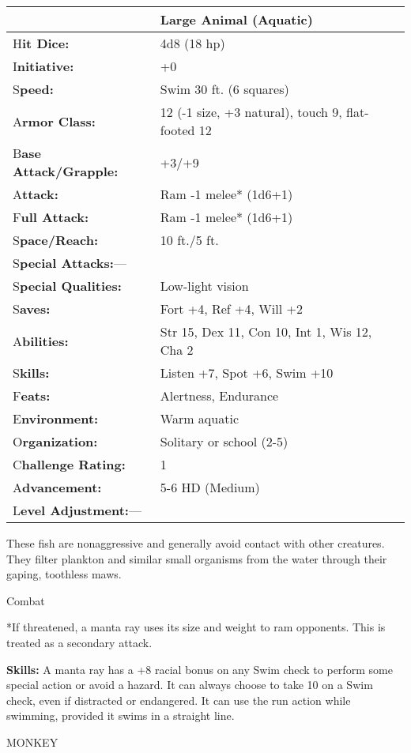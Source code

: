 \documentclass{article}
\begin{document}
\begin{tabular}{|>{\raggedright}p{91pt}|>{\raggedright}p{186pt}|}
\hline
  & Large Animal (Aquatic)\tabularnewline
\hline
H\textbf{it Dice:} & 4d8 (18 hp)\tabularnewline
\hline
I\textbf{nitiative:} & +0\tabularnewline
\hline
S\textbf{peed:} & Swim 30 ft. (6 squares)\tabularnewline
\hline
A\textbf{rmor Class:} & 12 (-1 size, +3 natural), touch 9, flat-footed 12\tabularnewline
\hline
B\textbf{ase Attack/Grapple:} & +3/+9\tabularnewline
\hline
A\textbf{ttack:} & Ram -1 melee* (1d6+1)\tabularnewline
\hline
F\textbf{ull Attack:} & Ram -1 melee* (1d6+1)\tabularnewline
\hline
S\textbf{pace/Reach:} & 10 ft./5 ft.\tabularnewline
\hline
S\textbf{pecial Attacks:}--- & \tabularnewline
\hline
S\textbf{pecial Qualities:} & Low-light vision\tabularnewline
\hline
S\textbf{aves:} & Fort +4, Ref +4, Will +2\tabularnewline
\hline
A\textbf{bilities:} & Str 15, Dex 11, Con 10, Int 1, Wis 12, Cha 2\tabularnewline
\hline
S\textbf{kills:} & Listen +7, Spot +6, Swim +10\tabularnewline
\hline
F\textbf{eats:} & Alertness, Endurance\tabularnewline
\hline
E\textbf{nvironment:} & Warm aquatic\tabularnewline
\hline
O\textbf{rganization:} & Solitary or school (2-5)\tabularnewline
\hline
C\textbf{hallenge Rating:} & 1\tabularnewline
\hline
A\textbf{dvancement:} & 5-6 HD (Medium)\tabularnewline
\hline
L\textbf{evel Adjustment:}--- & \tabularnewline
\hline
\end{tabular}

These fish are nonaggressive and generally avoid contact with other creatures. 
They filter plankton and similar small organisms from the water through their gaping, 
toothless maws.

Combat

*If threatened, a manta ray uses its size and weight to ram opponents. This is 
treated as a secondary attack.

\textbf{Skills:} A manta ray has a +8 racial bonus on any Swim check to perform 
some special action or avoid a hazard. It can always choose to take 10 on a Swim 
check, even if distracted or endangered. It can use the run action while swimming, 
provided it swims in a straight line.

\vspace{12pt}
MONKEY
\end{document}

